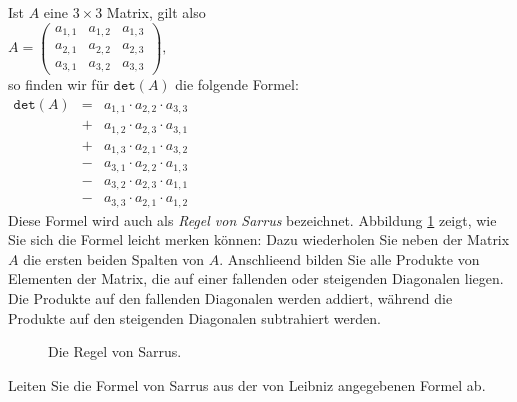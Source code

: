 \example
Ist $A$ eine $3 \times 3$ Matrix, gilt also
\\[0.2cm]
\hspace*{1.3cm}
$A = \left(
  \begin{array}{lll}
    a_{1,1} & a_{1,2} & a_{1,3} \\[0.2cm] 
    a_{2,1} & a_{2,2} & a_{2,3} \\[0.2cm]
    a_{3,1} & a_{3,2} & a_{3,3} 
  \end{array}
  \right),
$
\\[0.2cm]
so finden wir f\"ur $\mathtt{det}(A)$ die folgende Formel:
\\[0.2cm]
\hspace*{1.3cm}
$
\begin{array}{lcl}
  \mathtt{det}(A) & = & a_{1,1} \cdot a_{2,2} \cdot a_{3,3}  \\
                  & + & a_{1,2} \cdot a_{2,3} \cdot a_{3,1}  \\
                  & + & a_{1,3} \cdot a_{2,1} \cdot a_{3,2}  \\
                  & - & a_{3,1} \cdot a_{2,2} \cdot a_{1,3}  \\
                  & - & a_{3,2} \cdot a_{2,3} \cdot a_{1,1}  \\
                  & - & a_{3,3} \cdot a_{2,1} \cdot a_{1,2}
\end{array}
$
\\[0.2cm]
Diese Formel wird auch als \emph{Regel von Sarrus} bezeichnet.  Abbildung \ref{fig:sarrus.eps}
zeigt, wie Sie sich die Formel leicht merken k\"onnen:  Dazu wiederholen Sie neben der Matrix $A$ die
ersten beiden Spalten von $A$.  Anschlie\3end bilden Sie alle Produkte von Elementen der Matrix, die
auf einer fallenden oder steigenden Diagonalen liegen.  Die Produkte auf den fallenden Diagonalen
werden addiert, w\"ahrend die Produkte auf den steigenden Diagonalen subtrahiert werden.
\eoxs

\begin{figure}[h]
  \centering
  \caption{Die Regel von Sarrus.}
  \label{fig:sarrus.eps}
\end{figure}

\exercise
Leiten Sie die Formel von Sarrus aus der von Leibniz angegebenen Formel ab. 
\eox



